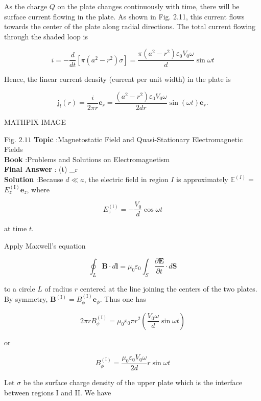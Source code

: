 \documentclass[10pt]{article}
\begin{document}
As the charge $Q$ on the plate changes continuously with time, there will be surface current flowing in the plate. As shown in Fig. 2.11, this current flows towards the center of the plate along radial directions. The total current flowing through the shaded loop is

$$
i=-\frac{d}{d t}\left[\pi\left(a^{2}-r^{2}\right) \sigma\right]=\frac{\pi\left(a^{2}-r^{2}\right) \varepsilon_{0} V_{0} \omega}{d} \sin \omega t
$$

Hence, the linear current density (current per unit width) in the plate is

$$
\mathrm{j}_{l}(r)=\frac{i}{2 \pi r} \mathbf{e}_{r}=\frac{\left(a^{2}-r^{2}\right) \varepsilon_{0} V_{0} \omega}{2 d r} \sin (\omega t) \mathbf{e}_{r} .
$$

MATHPIX IMAGE

Fig. $2.11$ 
\textbf{Topic} :Magnetostatic Field and Quasi-Stationary Electromagnetic Fields\\
\textbf{Book} :Problems and Solutions on Electromagnetism\\
\textbf{Final Answer} : \sin (\omega t) _{r}\\


\textbf{Solution} :Because $d \ll a$, the electric field in region $I$ is approximately $\mathbb{E}^{(I)}=$ $E_{z}^{(\mathrm{I})} \mathbf{e}_{z}$, where

$$
E_{z}^{(\mathrm{l})}=-\frac{V_{0}}{d} \cos \omega t
$$

at time $t$.

Apply Maxwell's equation

$$
\oint_{L} \mathbf{B} \cdot d \mathbf{l}=\mu_{0} \varepsilon_{0} \int_{S} \frac{\partial \mathbf{E}}{\partial t} \cdot d \mathbf{S}
$$

to a circle $L$ of radius $r$ centered at the line joining the centers of the two plates. By symmetry, $\mathbf{B}^{(\mathrm{I})}=B_{\phi}^{(\mathrm{I})} \mathbf{e}_{\phi}$. Thus one has

$$
2 \pi r B_{\phi}^{(\mathrm{I})}=\mu_{0} \varepsilon_{0} \pi r^{2}\left(\frac{V_{0} \omega}{d} \sin \omega t\right)
$$

or

$$
B_{\phi}^{(\mathrm{I})}=\frac{\mu_{0} \varepsilon_{0} V_{0} \omega}{2 d} r \sin \omega t
$$

 Let $\sigma$ be the surface charge density of the upper plate which is the interface between regions I and II. We have
\end{document}
